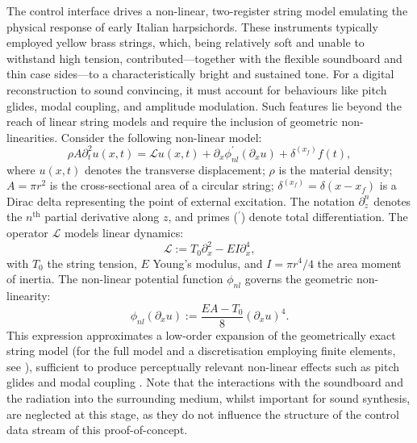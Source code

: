 The control interface drives a non-linear, two-register string model emulating the physical response of early Italian harpsichords. These instruments typically employed yellow brass strings, which, being relatively soft and unable to withstand high tension, contributed—together with the flexible soundboard and thin case sides—to a characteristically bright and sustained tone. For a digital reconstruction to sound convincing, it must account for behaviours like pitch glides, modal coupling, and amplitude modulation. Such features lie beyond the reach of linear string models and require the inclusion of geometric non-linearities. Consider the following non-linear model:
\begin{equation}\label{eq:CntModel}
\rho A \partial_t^2 u(x,t) = \mathcal L u(x,t) + \partial_x\phi^\prime_{nl}(\partial_x u) + \delta^{(x_f)}f(t),
\end{equation}
where $u(x,t)$ denotes the transverse displacement; $\rho$ is the material density; $A = \pi r^2$ is the cross-sectional area of a circular string; $\delta^{(x_f)} = \delta(x - x_f)$ is a Dirac delta representing the point of external excitation. The notation $\partial_z^n$ denotes the $n^{\text{th}}$ partial derivative along $z$, and primes ($^\prime$) denote total differentiation. 
The operator $\mathcal L$ models linear dynamics:
\begin{equation}
\mathcal L := T_0 \partial_x^2 - EI \partial_x^4,
\end{equation}
with $T_0$ the string tension, $E$ Young’s modulus, and $I = \pi r^4/4$ the area moment of inertia. The non-linear potential function $\phi_{nl}$ governs the geometric non-linearity:
\begin{equation}\label{eq:phiNL}
\phi_{nl}(\partial_x u) := \frac{EA - T_0}{8} (\partial_x u)^4.
\end{equation}
This expression approximates a low-order expansion of the geometrically exact string model (for the full model and a discretisation employing finite elements, see \cite{chabassier_energy_2010}), sufficient to produce perceptually relevant non-linear effects such as pitch glides and modal coupling \cite{russo_scalar_2024}. Note that the interactions with the soundboard and the radiation into the surrounding medium, whilst important for sound synthesis, are neglected at this stage, as they do not influence the structure of the control data stream of this proof-of-concept.

